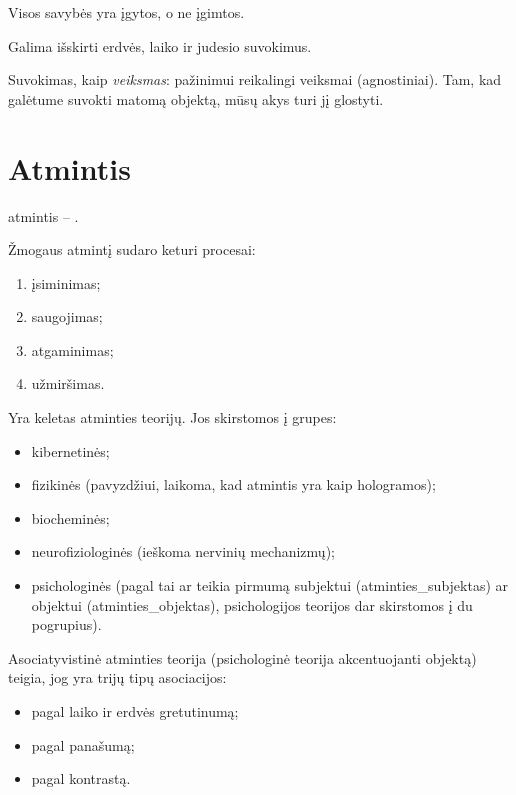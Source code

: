 Visos savybės yra įgytos, o ne įgimtos.

Galima išskirti erdvės, laiko ir judesio suvokimus.

Suvokimas, kaip \emph{veiksmas}: pažinimui reikalingi veiksmai 
(agnostiniai). %
Tam, kad galėtume suvokti matomą objektą, mūsų akys turi jį glostyti.

\section{Atmintis}

\Gls{atmintis} – .

Žmogaus atmintį sudaro keturi procesai:

\begin{enumerate}
  \item įsiminimas;
  \item saugojimas;
  \item atgaminimas;
  \item užmiršimas.
\end{enumerate}

Yra keletas atminties teorijų. Jos skirstomos į grupes:

\begin{itemize}
  \item kibernetinės;
  \item fizikinės (pavyzdžiui, laikoma, kad atmintis yra kaip hologramos);
  \item biocheminės;
  \item neurofiziologinės (ieškoma nervinių mechanizmų);
  \item psichologinės (pagal tai ar teikia pirmumą subjektui 
    (\gls{atminties_subjektas}) ar objektui (\gls{atminties_objektas}),
    psichologijos teorijos dar skirstomos į du pogrupius).
\end{itemize}


Asociatyvistinė atminties teorija (psichologinė teorija akcentuojanti
objektą) teigia, jog yra trijų tipų asociacijos:

\begin{itemize}
  \item pagal laiko ir erdvės gretutinumą;
  \item pagal panašumą;
  \item pagal kontrastą.
\end{itemize}


